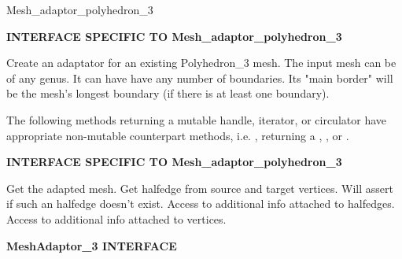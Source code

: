 \begin{ccRefClass}{Mesh_adaptor_polyhedron_3}
\ccCreation
{}  %

{\bf INTERFACE SPECIFIC TO Mesh\_adaptor\_polyhedron\_3}

{
Create an adaptator for an existing Polyhedron\_3 mesh. The input mesh can be of any genus. It can have have any number of boundaries. Its "main border" will be the mesh's longest boundary (if there is at least one boundary).
}


\ccOperations

The following methods returning a mutable handle, iterator, or circulator have appropriate
non-mutable counterpart methods, i.e. , returning a ,
, or .

{\bf INTERFACE SPECIFIC TO Mesh\_adaptor\_polyhedron\_3}

{
Get the adapted mesh.
}
{
}
{
Get halfedge from source and target vertices. Will assert if such an halfedge doesn't exist.
}
{
}
{
Access to additional info attached to halfedges.
}
{
}
{
Access to additional info attached to vertices.
}
{
}

{\bf MeshAdaptor\_3 INTERFACE}


\end{ccRefClass}
